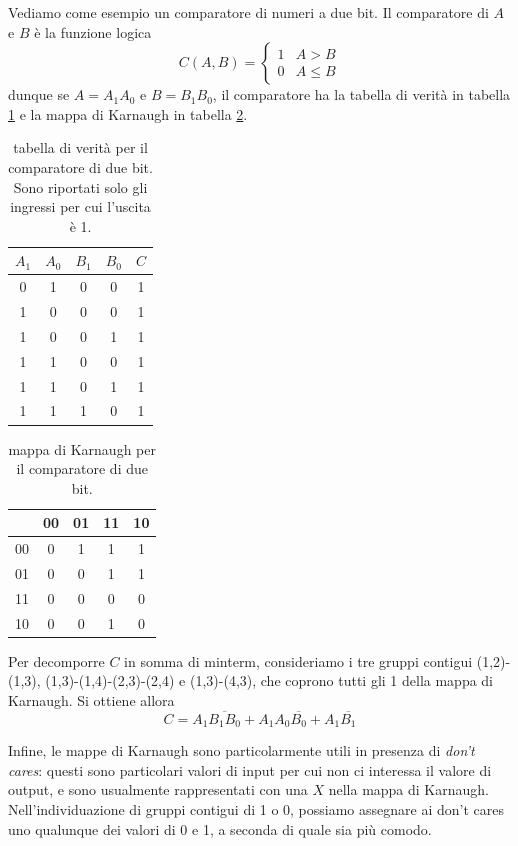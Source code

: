 \documentclass[a4paper, 11pt]{article}
\begin{document}
Vediamo come esempio un comparatore di numeri a due bit. Il comparatore di $A$ e $B$ è la funzione logica
\[C(A,B)=\begin{cases}
1&A>B\\0&A\leq B
\end{cases}\]
dunque se $A=A_1A_0$ e $B=B_1B_0$, il comparatore ha la tabella di verità in tabella \ref{tab:comp1} e la mappa di Karnaugh in tabella \ref{tab:comp2}.
\begin{table}[h!]
	\centering
	\begin{tabular}{c c c c |c}
		$A_1$&$A_0$&$B_1$&$B_0$&$C$\\\hline
		0&1&0&0&1\\1&0&0&0&1\\1&0&0&1&1\\1&1&0&0&1\\1&1&0&1&1\\1&1&1&0&1
		
	\end{tabular}
	\caption{tabella di verità per il comparatore di due bit. Sono riportati solo gli ingressi per cui l'uscita è 1.}
	\label{tab:comp1}
\end{table}
\begin{table}[h!]
	\centering
	\begin{tabular}{c |c c c c}
	\backslashbox{$B_1B_0$}{$A_1A_0$}&00&01&11&10\\\hline00&0&1&1&1\\01&0&0&1&1\\11&0&0&0&0\\10&0&0&1&0
	\end{tabular}
	\caption{mappa di Karnaugh per il comparatore di due bit.}
	\label{tab:comp2}
\end{table}
Per decomporre $C$ in somma di minterm, consideriamo i tre gruppi contigui (1,2)-(1,3), (1,3)-(1,4)-(2,3)-(2,4) e (1,3)-(4,3), che coprono tutti gli 1 della mappa di Karnaugh. Si ottiene allora
\[C=A_1\overline{B_1B_0}+A_1A_0\overline{B_0}+A_1\overline{B_1}\]

Infine, le mappe di Karnaugh sono particolarmente utili in presenza di \emph{don't cares}: questi sono particolari valori di input per cui non ci interessa il valore di output, e sono usualmente rappresentati con una $X$ nella mappa di Karnaugh. Nell'individuazione di gruppi contigui di 1 o 0, possiamo assegnare ai don't cares uno qualunque dei valori di 0 e 1, a seconda di quale sia più comodo. %
\end{document}
